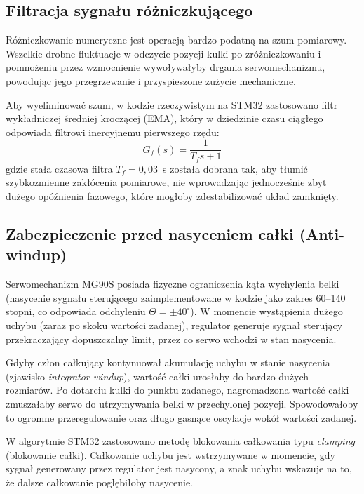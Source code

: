 \subsection{Filtracja sygnału różniczkującego}
Różniczkowanie numeryczne jest operacją bardzo podatną na szum pomiarowy.
Wszelkie drobne fluktuacje w odczycie pozycji kulki po zróżniczkowaniu i pomnożeniu
przez wzmocnienie wywoływałyby drgania serwomechanizmu,
powodując jego przegrzewanie i przyspieszone zużycie mechaniczne.

Aby wyeliminować szum, w kodzie rzeczywistym na STM32 zastosowano filtr
wykładniczej średniej kroczącej (EMA), który w dziedzinie czasu ciągłego
odpowiada filtrowi inercyjnemu pierwszego rzędu:
\begin{equation}
    G_f(s) = \frac{1}{T_f s + 1}
\end{equation}
gdzie stała czasowa filtra $T_f = 0{,}03$~s została dobrana tak, aby tłumić
szybkozmienne zakłócenia pomiarowe, nie wprowadzając jednocześnie zbyt
dużego opóźnienia fazowego, które mogłoby zdestabilizować układ zamknięty.

\subsection{Zabezpieczenie przed nasyceniem całki (Anti-windup)}
Serwomechanizm MG90S posiada fizyczne ograniczenia kąta wychylenia belki
(nasycenie sygnału sterującego zaimplementowane w kodzie jako zakres
60--140 stopni, co odpowiada odchyleniu $\Theta = \pm 40^{\circ}$). W momencie
wystąpienia dużego uchybu (zaraz po skoku wartości zadanej), regulator
generuje sygnał sterujący przekraczający dopuszczalny limit, przez co
serwo wchodzi w stan nasycenia.

Gdyby człon całkujący kontynuował akumulację uchybu w stanie nasycenia
(zjawisko \textit{integrator windup}), wartość całki urosłaby do bardzo
dużych rozmiarów. Po dotarciu kulki do punktu zadanego, nagromadzona wartość
całki zmuszałaby serwo do utrzymywania belki w przechylonej pozycji.
Spowodowałoby to ogromne przeregulowanie oraz długo gasnące oscylacje
wokół wartości zadanej.

W algorytmie STM32 zastosowano metodę blokowania całkowania typu
\textit{clamping} (blokowanie całki). Całkowanie uchybu jest wstrzymywane
 w momencie, gdy sygnał generowany przez regulator jest nasycony, a znak uchybu wskazuje
na to, że dalsze całkowanie pogłębiłoby nasycenie. 
